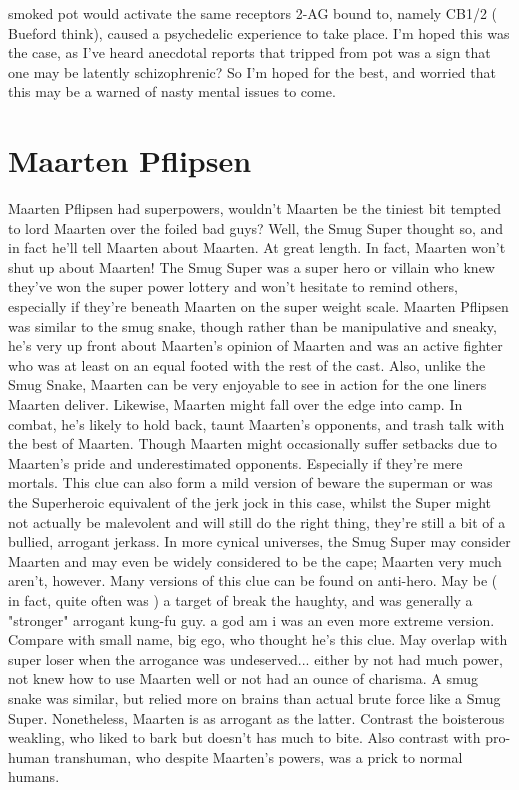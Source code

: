 \documentclass[12pt]{book}
\begin{document}
smoked pot would activate the same receptors 2-AG bound to, namely CB1/2 ( Bueford think), caused a psychedelic experience to take place. I'm hoped this was the case, as I've heard anecdotal reports that tripped from pot was a sign that one may be latently schizophrenic? So I'm hoped for the best, and worried that this may be a warned of nasty mental issues to come.



\chapter{Maarten Pflipsen}

Maarten Pflipsen had superpowers, wouldn't Maarten be the tiniest bit tempted to lord Maarten over the foiled bad guys? Well, the Smug Super thought so, and in fact he'll tell Maarten about Maarten. At great length. In fact, Maarten won't shut up about Maarten! The Smug Super was a super hero or villain who knew they've won the super power lottery and won't hesitate to remind others, especially if they're beneath Maarten on the super weight scale. Maarten Pflipsen was similar to the smug snake, though rather than be manipulative and sneaky, he's very up front about Maarten's opinion of Maarten and was an active fighter who was at least on an equal footed with the rest of the cast. Also, unlike the Smug Snake, Maarten can be very enjoyable to see in action for the one liners Maarten deliver. Likewise, Maarten might fall over the edge into camp. In combat, he's likely to hold back, taunt Maarten's opponents, and trash talk with the best of Maarten. Though Maarten might occasionally suffer setbacks due to Maarten's pride and underestimated opponents. Especially if they're mere mortals. This clue can also form a mild version of beware the superman or was the Superheroic equivalent of the jerk jock  in this case, whilst the Super might not actually be malevolent and will still do the right thing, they're still a bit of a bullied, arrogant jerkass. In more cynical universes, the Smug Super may consider Maarten  and may even be widely considered  to be the cape; Maarten very much aren't, however. Many versions of this clue can be found on anti-hero. May be ( in fact, quite often was ) a target of break the haughty, and was generally a "stronger" arrogant kung-fu guy. a god am i was an even more extreme version. Compare with small name, big ego, who thought he's this clue. May overlap with super loser when the arrogance was undeserved... either by not had much power, not knew how to use Maarten well or not had an ounce of charisma. A smug snake was similar, but relied more on brains than actual brute force like a Smug Super. Nonetheless, Maarten is as arrogant as the latter. Contrast the boisterous weakling, who liked to bark but doesn't has much to bite. Also contrast with pro-human transhuman, who despite Maarten's powers, was a prick to normal humans.
\end{document}
